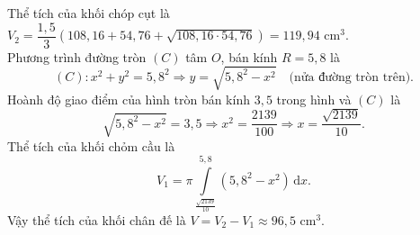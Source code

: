\begin{ex}
{		Thể tích của khối chóp cụt là $V_2 = \dfrac{1{,}5}{3} \left(108{,}16 + 54{,}76 + \sqrt{108{,}16 \cdot 54{,}76} \right) =119{,}94$ cm$^3$.\\
		Phương trình đường tròn $(C)$ tâm $O$, bán kính $R = 5{,}8$ là
		$$(C)\colon x^2 + y^2 = 5{,}8^2 \Rightarrow y = \sqrt{5{,}8^2 - x^2} \quad \text{(nửa đường tròn trên).}$$
		Hoành độ giao điểm của hình tròn bán kính $3{,}5$ trong hình và  $(C)$ là
		$$\sqrt{5{,}8^2 - x^2} = 3{,}5 \Rightarrow x^2 =\dfrac{2139}{100} \Rightarrow x = \dfrac{\sqrt{2139}}{10}.$$
		Thể tích của khối chỏm cầu là 
		$$V_1 = \pi\displaystyle \int\limits_{\tfrac{\sqrt{2139}}{10}}^{5{,}8} \left(5{,}8^2 - x^2 \right)\mathrm{\,d}x.$$
		Vậy thể tích của khối chân đế là $V= V_2 - V_1 \approx 96{,}5$ cm$^3$.
	}
\end{ex}


